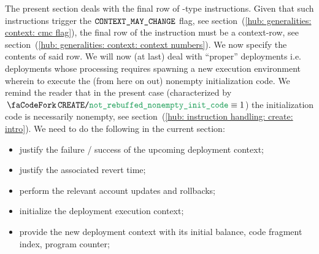 \begin{center}
\end{center}
The present section deals with the final row of -type instructions.
Given that such instructions trigger the $\texttt{CONTEXT\_MAY\_CHANGE}$ flag, see section~(\ref{hub: generalities: context: cmc flag}), the final row of the instruction must be a context-row, see section~(\ref{hub: generalities: context: context numbers}).
We now specify the contents of said row.
We will now (at last) deal with ``proper'' deployments i.e. deployments whose processing requires spawning a new execution environment wherein to execute the (from here on out) nonempty initialization code. We remind the reader that in the present case (characterized by $\scenCreateExecutionNonEmptyInitCode \equiv 1$) the initialization code is necessarily nonempty, see section~(\ref{hub: instruction handling: create: intro}). We need to do the following in the current section:
\begin{itemize}
	\item justify the failure / success of the upcoming deployment context;
	\item justify the associated revert time;
	\item perform the relevant account updates and rollbacks;
	\item initialize the deployment execution context; 
	\item provide the new deployment context with its initial balance, code fragment index, program counter; 
\end{itemize}

